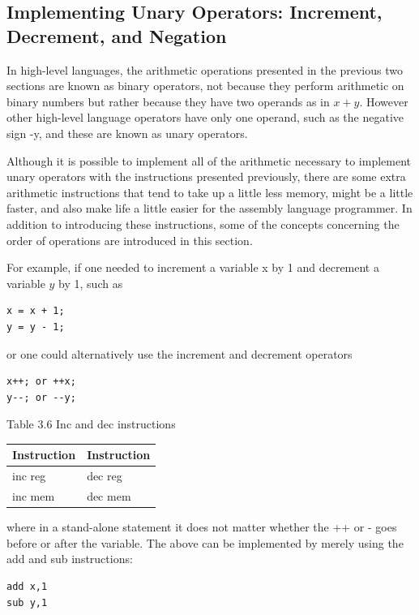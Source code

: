 \documentclass[10pt]{book}
\begin{document}
\subsection{Implementing Unary Operators: Increment, Decrement, and Negation}
In high-level languages, the arithmetic operations presented in the previous two sections are known as binary operators, not because they perform arithmetic on binary numbers but rather because they have two operands as in $x+y$. However other high-level language operators have only one operand, such as the negative sign -y, and these are known as unary operators.

Although it is possible to implement all of the arithmetic necessary to implement unary operators with the instructions presented previously, there are some extra arithmetic instructions that tend to take up a little less memory, might be a little faster, and also make life a little easier for the assembly language programmer. In addition to introducing these instructions, some of the concepts concerning the order of operations are introduced in this section.

For example, if one needed to increment a variable x by 1 and decrement a variable $y$ by 1, such as

\begin{verbatim}
x = x + 1;
y = y - 1;
\end{verbatim}

or one could alternatively use the increment and decrement operators

\begin{verbatim}
x++; or ++x;
y--; or --y;
\end{verbatim}

Table 3.6 Inc and dec instructions

\begin{center}
\begin{tabular}{|l|l|}
\hline
Instruction & Instruction \\
\hline
inc reg & dec reg \\
\hline
inc mem & dec mem \\
\hline
\end{tabular}
\end{center}

where in a stand-alone statement it does not matter whether the ++ or - goes before or after the variable. The above can be implemented by merely using the add and sub instructions:

\begin{verbatim}
add x,1
sub y,1
\end{verbatim}
\end{document}
